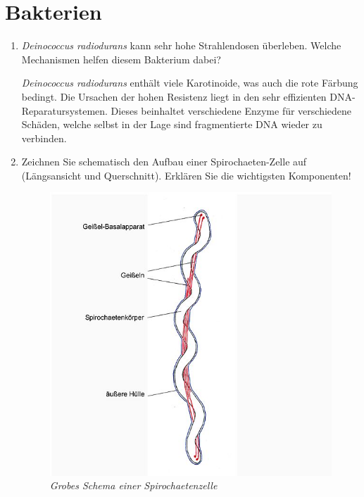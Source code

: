 \section{Bakterien}
\begin{enumerate}
	\item \emph{Deinococcus radiodurans} kann sehr hohe Strahlendosen überleben. Welche Mechanismen helfen diesem Bakterium dabei?
		
		\emph{Deinococcus radiodurans} enthält viele Karotinoide,
		was auch die rote Färbung bedingt.
		Die Ursachen der hohen Resistenz liegt in den sehr effizienten DNA-Reparatursystemen.
		Dieses beinhaltet verschiedene Enzyme für verschiedene Schäden,
		welche selbst in der Lage sind fragmentierte DNA wieder zu verbinden.

	\item Zeichnen Sie schematisch den Aufbau einer Spirochaeten-Zelle auf (Längsansicht und Querschnitt). Erklären Sie die wichtigsten Komponenten!
		
		\begin{figure}[ht!]
		\begin{center}
		\includegraphics[scale=0.42]{./pictures/schema_spiro_596}
		\end{center}
		\caption{\slshape{Grobes Schema einer Spirochaetenzelle}}
		\label{fig:spiroschema}
		\end{figure}
			

\end{enumerate}
